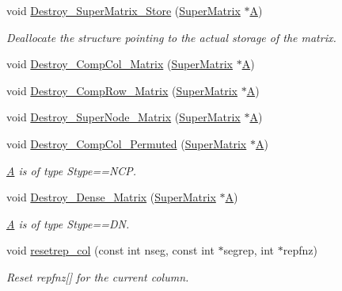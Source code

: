 \begin{DoxyCompactItemize}
void \hyperlink{scipy-0_814_80_2scipy_2sparse_2linalg_2dsolve_2SuperLU_2SRC_2util_8c_ac16a0aea75cf99b4d38ec4ede6f13eb4}{Destroy\+\_\+\+Super\+Matrix\+\_\+\+Store} (\hyperlink{structSuperMatrix}{Super\+Matrix} $\ast$\hyperlink{classA}{A})
\begin{DoxyCompactList}\small\item\em Deallocate the structure pointing to the actual storage of the matrix. \end{DoxyCompactList}\item 
void \hyperlink{scipy-0_814_80_2scipy_2sparse_2linalg_2dsolve_2SuperLU_2SRC_2util_8c_a27491a8171a480d6c98e6d1e535e1973}{Destroy\+\_\+\+Comp\+Col\+\_\+\+Matrix} (\hyperlink{structSuperMatrix}{Super\+Matrix} $\ast$\hyperlink{classA}{A})
\item 
void \hyperlink{scipy-0_814_80_2scipy_2sparse_2linalg_2dsolve_2SuperLU_2SRC_2util_8c_a6292e6a8f2b75101294f2e99927b5d2a}{Destroy\+\_\+\+Comp\+Row\+\_\+\+Matrix} (\hyperlink{structSuperMatrix}{Super\+Matrix} $\ast$\hyperlink{classA}{A})
\item 
void \hyperlink{scipy-0_814_80_2scipy_2sparse_2linalg_2dsolve_2SuperLU_2SRC_2util_8c_aea724a390aed4ef00a4b8ed783c60014}{Destroy\+\_\+\+Super\+Node\+\_\+\+Matrix} (\hyperlink{structSuperMatrix}{Super\+Matrix} $\ast$\hyperlink{classA}{A})
\item 
void \hyperlink{scipy-0_814_80_2scipy_2sparse_2linalg_2dsolve_2SuperLU_2SRC_2util_8c_a7285ca16a0b84b4333d71efeb65c0126}{Destroy\+\_\+\+Comp\+Col\+\_\+\+Permuted} (\hyperlink{structSuperMatrix}{Super\+Matrix} $\ast$\hyperlink{classA}{A})
\begin{DoxyCompactList}\small\item\em \hyperlink{classA}{A} is of type Stype==N\+C\+P. \end{DoxyCompactList}\item 
void \hyperlink{scipy-0_814_80_2scipy_2sparse_2linalg_2dsolve_2SuperLU_2SRC_2util_8c_a301f89dc9483e5bcdc47fc96e8645cf7}{Destroy\+\_\+\+Dense\+\_\+\+Matrix} (\hyperlink{structSuperMatrix}{Super\+Matrix} $\ast$\hyperlink{classA}{A})
\begin{DoxyCompactList}\small\item\em \hyperlink{classA}{A} is of type Stype==D\+N. \end{DoxyCompactList}\item 
void \hyperlink{scipy-0_814_80_2scipy_2sparse_2linalg_2dsolve_2SuperLU_2SRC_2util_8c_a67bce8b2142b3be41583de4fbea02cb0}{resetrep\+\_\+col} (const int nseg, const int $\ast$segrep, int $\ast$repfnz)
\begin{DoxyCompactList}\small\item\em Reset repfnz\mbox{[}\mbox{]} for the current column. \end{DoxyCompactList}\item 

\end{DoxyCompactItemize}
